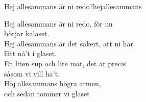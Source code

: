 \begin{song}{Hej allesammans är ni redo?}{hejallesammans}
\begin{vers}
Hej allesammans är ni redo, för nu \\
börjar kalaset.\\
Hej allesammans är det säkert, att ni har\\
fått nå't i glaset.\\
En liten sup och lite mat, det är precis\\
såsom vi vill ha't.\\
Höj allesammans högra armen,\\
och sedan tömmer vi glaset\\
\end{vers}
\end{song}
